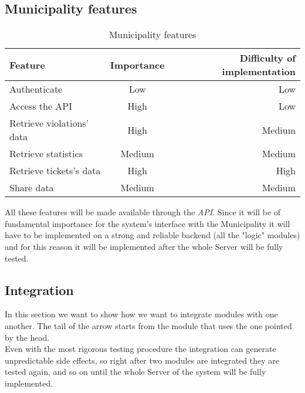         \subsection{Municipality features}
        \begin{table}[h!]
            \begin{center}
            
            \begin{tabular}{l|c|r} %
                \textbf{Feature} & \textbf{Importance} & \textbf{Difficulty of implementation}\\
                
                \hline
                Authenticate & Low & Low\\
                Access the API & High & Low\\
                Retrieve violations' data & High & Medium\\
                Retrieve statistics & Medium & Medium\\
                Retrieve tickets's data & High & High\\
                Share data & Medium & Medium\\

            \end{tabular}
            \caption{Municipality features}
            \label{tab:table1}
            \end{center}
        \end{table}

        All these features will be made available through the \emph{API}. Since it will be of fundamental importance for the 
        system's interface with the Municipality it will have to be implemented on a strong and reliable backend (all the 
        "logic" modules) and for this reason it will be implemented after the whole Server will be fully tested.\\

    \subsection{Integration}

        In this section we want to show how we want to integrate modules with one another. The tail of the arrow starts from the module 
        that uses the one pointed by the head.\\
        Even with the most rigorous testing procedure the integration can generate unpredictable side effects, so right after two modules 
        are integrated they are tested again, and so on until the whole Server of the system will be fully implemented.

